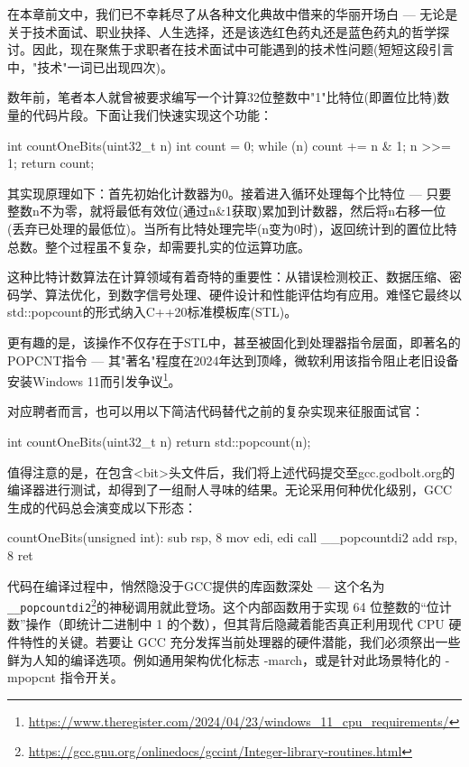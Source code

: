 在本章前文中，我们已不幸耗尽了从各种文化典故中借来的华丽开场白 --- 无论是关于技术面试、职业抉择、人生选择，还是该选红色药丸还是蓝色药丸的哲学探讨。因此，现在聚焦于求职者在技术面试中可能遇到的技术性问题(短短这段引言中，"技术"一词已出现四次)。

数年前，笔者本人就曾被要求编写一个计算32位整数中"1"比特位(即置位比特)数量的代码片段。下面让我们快速实现这个功能：

\begin{cpp}
int countOneBits(uint32_t n) {
  int count = 0;
  while (n) {
    count += n & 1;
    n >>= 1;
  }
  return count;
}
\end{cpp}

其实现原理如下：首先初始化计数器为0。接着进入循环处理每个比特位 --- 只要整数n不为零，就将最低有效位(通过n\&1获取)累加到计数器，然后将n右移一位(丢弃已处理的最低位)。当所有比特处理完毕(n变为0时)，返回统计到的置位比特总数。整个过程虽不复杂，却需要扎实的位运算功底。

这种比特计数算法在计算领域有着奇特的重要性：从错误检测校正、数据压缩、密码学、算法优化，到数字信号处理、硬件设计和性能评估均有应用。难怪它最终以std::popcount的形式纳入C++20标准模板库(STL)。

更有趣的是，该操作不仅存在于STL中，甚至被固化到处理器指令层面，即著名的POPCNT指令 --- 其"著名"程度在2024年达到顶峰，微软利用该指令阻止老旧设备安装Windows 11而引发争议\footnote{\url{https://www.theregister.com/2024/04/23/windows_11_cpu_requirements/}}。

对应聘者而言，也可以用以下简洁代码替代之前的复杂实现来征服面试官：

\begin{cpp}
int countOneBits(uint32_t n) {
  return std::popcount(n);
}
\end{cpp}

值得注意的是，在包含<bit>头文件后，我们将上述代码提交至gcc.godbolt.org的编译器进行测试，却得到了一组耐人寻味的结果。无论采用何种优化级别，GCC生成的代码总会演变成以下形态：

\begin{shell}
countOneBits(unsigned int):
  sub rsp, 8
  mov edi, edi
  call __popcountdi2
  add rsp, 8
  ret
\end{shell}

代码在编译过程中，悄然隐没于GCC提供的库函数深处 --- 这个名为\verb|__popcountdi2|\footnote{\url{https://gcc.gnu.org/onlinedocs/gccint/Integer-library-routines.html}}的神秘调用就此登场。这个内部函数用于实现 64 位整数的“位计数”操作（即统计二进制中 1 的个数），但其背后隐藏着能否真正利用现代 CPU 硬件特性的关键。若要让 GCC 充分发挥当前处理器的硬件潜能，我们必须祭出一些鲜为人知的编译选项。例如通用架构优化标志 -march，或是针对此场景特化的 -mpopcnt 指令开关。

